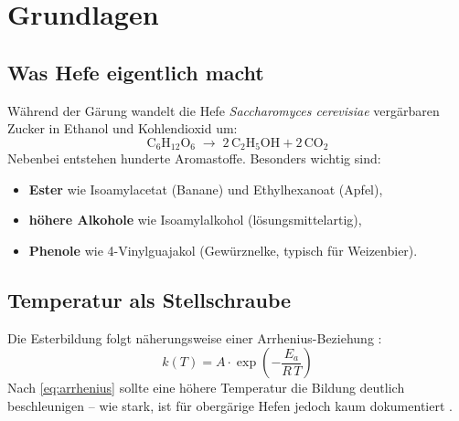 \chapter{Grundlagen}
\label{ch:grundlagen}

\section{Was Hefe eigentlich macht}
Während der Gärung wandelt die Hefe \emph{Saccharomyces cerevisiae} vergärbaren
Zucker in Ethanol und Kohlendioxid um:
\begin{equation}
  \mathrm{C_6H_{12}O_6} \;\longrightarrow\; 2\,\mathrm{C_2H_5OH} + 2\,\mathrm{CO_2}
  \label{eq:gaerung}
\end{equation}
Nebenbei entstehen hunderte Aromastoffe. Besonders wichtig sind:
\begin{itemize}
  \item \textbf{Ester} wie Isoamylacetat (Banane) und Ethylhexanoat (Apfel),
  \item \textbf{höhere Alkohole} wie Isoamylalkohol (lösungsmittelartig),
  \item \textbf{Phenole} wie 4-Vinylguajakol (Gewürznelke, typisch für Weizenbier).
\end{itemize}

\section{Temperatur als Stellschraube}
Die Esterbildung folgt näherungsweise einer Arrhenius-Beziehung
\citep{gerstner2020kinetik}:
\begin{equation}
  k(T) = A \cdot \exp\!\left(-\frac{E_a}{R\,T}\right)
  \label{eq:arrhenius}
\end{equation}
Nach \cref{eq:arrhenius} sollte eine höhere Temperatur die Bildung deutlich
beschleunigen -- wie stark, ist für obergärige Hefen jedoch kaum dokumentiert
\citep{malz2021ester, hefeling2018obergaerig}.
